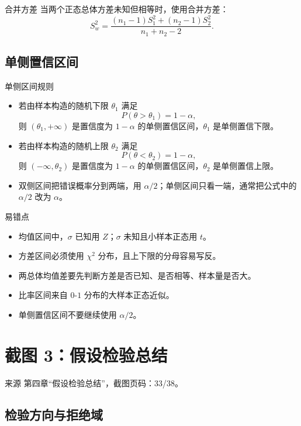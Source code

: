 \documentclass[UTF8,zihao=-4,fontset=fandol]{ctexart}
\begin{document}
\begin{keybox}{合并方差}
当两个正态总体方差未知但相等时，使用合并方差：
\[
S_w^2=
\frac{(n_1-1)S_1^2+(n_2-1)S_2^2}{n_1+n_2-2}.
\]
\end{keybox}

\subsection{单侧置信区间}

\begin{keybox}{单侧区间规则}
\begin{itemize}
  \item 若由样本构造的随机下限 $\theta_1$ 满足
  \[
  P(\theta>\theta_1)=1-\alpha,
  \]
  则 $(\theta_1,+\infty)$ 是置信度为 $1-\alpha$ 的单侧置信区间，$\theta_1$ 是单侧置信下限。
  \item 若由样本构造的随机上限 $\theta_2$ 满足
  \[
  P(\theta<\theta_2)=1-\alpha,
  \]
  则 $(-\infty,\theta_2)$ 是置信度为 $1-\alpha$ 的单侧置信区间，$\theta_2$ 是单侧置信上限。
  \item 双侧区间把错误概率分到两端，用 $\alpha/2$；单侧区间只看一端，通常把公式中的 $\alpha/2$ 改为 $\alpha$。
\end{itemize}
\end{keybox}

\begin{warnbox}{易错点}
\begin{itemize}
  \item 均值区间中，$\sigma$ 已知用 $Z$；$\sigma$ 未知且小样本正态用 $t$。
  \item 方差区间必须使用 $\chi^2$ 分布，且上下限的分母容易写反。
  \item 两总体均值差要先判断方差是否已知、是否相等、样本量是否大。
  \item 比率区间来自 $0$-$1$ 分布的大样本正态近似。
  \item 单侧置信区间不要继续使用 $\alpha/2$。
\end{itemize}
\end{warnbox}

\section{截图 3：假设检验总结}

\begin{sourcebox}{来源}
第四章“假设检验总结”，截图页码：33/38。
\end{sourcebox}

\subsection{检验方向与拒绝域}
\end{document}
